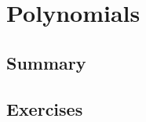   \newpage
  \section{Polynomials}
  \subsection*{Summary}
  \subsection*{Exercises}
  \setcounter{paragraph}{0}
